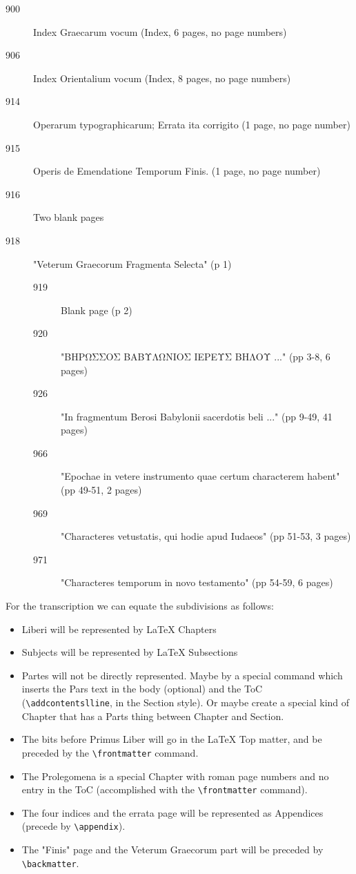 \documentclass{report}
\begin{document}
\begin{description}
\item[900] Index Graecarum vocum (Index, 6 pages, no page numbers)
\item[906] Index Orientalium vocum (Index,  8 pages, no page numbers)
\item[914] Operarum typographicarum; Errata ita corrigito (1 page, no page number)
\item[915] Operis de Emendatione Temporum Finis. (1 page, no page number)
\item[916] Two blank pages
\item[918] "Veterum Graecorum Fragmenta Selecta" (p 1)
\begin{description}
  \item[919] Blank page (p 2)
  \item[920] "ΒΗΡΩΣΣΟΣ ΒΑΒΥΛΩΝΙΟΣ ΙΕΡΕΥΣ ΒΗΛΟΥ ..." (pp 3-8, 6 pages)
  \item[926] "In fragmentum Berosi Babylonii sacerdotis beli ..." (pp 9-49, 41 pages)
  \item[966] "Epochae in vetere instrumento quae certum characterem habent" (pp 49-51, 2 pages)
  \item[969] "Characteres vetustatis, qui hodie apud Iudaeos" (pp 51-53, 3 pages)
  \item[971] "Characteres temporum in novo testamento" (pp 54-59, 6 pages)
\end{description}
\end{description}

For the transcription we can equate the subdivisions as follows:
\begin{itemize}
\item Liberi will be represented by LaTeX Chapters
\item Subjects will be represented by LaTeX Subsections
\item Partes will not be directly represented. Maybe by a special command which inserts the Pars text in the body (optional) and the ToC (\verb+\addcontentslline+, in the Section style). Or maybe create a special kind of Chapter that has a Parts thing between Chapter and Section.
\item The bits before Primus Liber will go in the LaTeX Top matter, and be preceded by the \verb+\frontmatter+ command.
\item The Prolegomena is a special Chapter with roman page numbers and no entry in the ToC (accomplished with the \verb+\frontmatter+ command).
\item The four indices and the errata page will be represented as Appendices (precede by \verb+\appendix+).
\item The "Finis" page and the Veterum Graecorum part will be preceded by \verb+\backmatter+.
\end{itemize}
\end{document}
